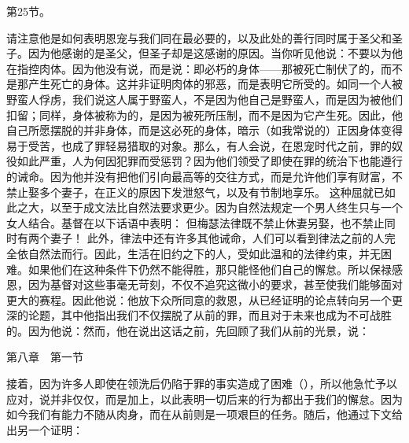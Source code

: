 第25节。\par

请注意他是如何表明恩宠与我们同在最必要的，以及此处的善行同时属于圣父和圣子。因为他感谢的是圣父，但圣子却是这感谢的原因。当你听见他说：不要以为他在指控肉体。因为他没有说，而是说：即必朽的身体——那被死亡制伏了的，而不是那产生死亡的身体。这并非证明肉体的邪恶，而是表明它所受的。如同一个人被野蛮人俘虏，我们说这人属于野蛮人，不是因为他自己是野蛮人，而是因为被他们扣留；同样，身体被称为的，是因为被死所压制，而不是因为它产生死。因此，他自己所愿摆脱的并非身体，而是这必死的身体，暗示（如我常说的）正因身体变得易于受苦，也成了罪轻易猎取的对象。那么，有人会说，在恩宠时代之前，罪的奴役如此严重，人为何因犯罪而受惩罚？因为他们领受了即使在罪的统治下也能遵行的诫命。因为他并没有把他们引向最高等的交往方式，而是允许他们享有财富，不禁止娶多个妻子，在正义的原因下发泄怒气，以及有节制地享乐。 这种屈就已如此之大，以至于成文法比自然法要求更少。因为自然法规定一个男人终生只与一个女人结合。基督在以下话语中表明： 但梅瑟法律既不禁止休妻另娶，也不禁止同时有两个妻子！ 此外，律法中还有许多其他诫命，人们可以看到律法之前的人完全依自然法而行。因此，生活在旧约之下的人，受如此温和的法律约束，并无困难。如果他们在这种条件下仍然不能得胜，那只能怪他们自己的懈怠。所以保禄感恩，因为基督对这些事毫无苛刻，不仅不追究这微小的要求，甚至使我们能够面对更大的赛程。因此他说：他放下众所同意的救恩，从已经证明的论点转向另一个更深的论题，其中他指出我们不仅摆脱了从前的罪，而且对于未来也成为不可战胜的。因为他说：然而，他在说出这话之前，先回顾了我们从前的光景，说：\par

第八章　第一节　\par

接着，因为许多人即使在领洗后仍陷于罪的事实造成了困难（），所以他急忙予以应对，说并非仅仅，而是加上，以此表明一切后来的行为都出于我们的懈怠。因为如今我们有能力不随从肉身，而在从前则是一项艰巨的任务。随后，他通过下文给出另一个证明：\par

